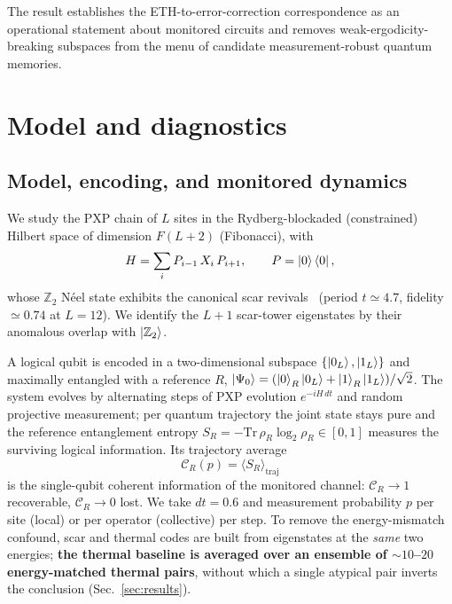 \documentclass[aps,prxquantum,twocolumn,superscriptaddress,floatfix,longbibliography]{revtex4-2}
\newcommand{\CR}{\mathcal{C}_R}
\newcommand{\Ztwo}{\mathbb{Z}_2}
\begin{document}
The result establishes the ETH-to-error-correction correspondence as an operational
statement about monitored circuits and removes weak-ergodicity-breaking subspaces
from the menu of candidate measurement-robust quantum memories.

\section{Model and diagnostics}

\subsection{Model, encoding, and monitored dynamics}

We study the PXP chain of $L$ sites in the Rydberg-blockaded (constrained)
Hilbert space of dimension $F(L{+}2)$ (Fibonacci), with
\begin{equation}
H = \sum_i P_{i-1}\, X_i\, P_{i+1}, \qquad P=\ket{0}\bra{0},
\end{equation}
whose $\Ztwo$ N\'eel state exhibits the canonical scar
revivals~\cite{Bernien2017,Turner2018,Lin2019,Ho2019} (period
$t\simeq4.7$, fidelity $\simeq0.74$ at $L=12$). We identify the $L{+}1$ scar-tower
eigenstates by their anomalous overlap with $\ket{\Ztwo}$.

A logical qubit is encoded in a two-dimensional subspace
$\{\ket{0_L},\ket{1_L}\}$ and maximally entangled with a reference $R$,
$\ket{\Psi_0}=(\ket{0}_R\ket{0_L}+\ket{1}_R\ket{1_L})/\sqrt2$. The system
evolves by alternating steps of PXP evolution $e^{-iH\,dt}$ and random projective
measurement; per quantum trajectory the joint state stays pure and the reference
entanglement entropy $S_R=-\mathrm{Tr}\,\rho_R\log_2\rho_R\in[0,1]$ measures the
surviving logical information. Its trajectory average
\begin{equation}
\CR(p) = \big\langle S_R \big\rangle_{\text{traj}}
\end{equation}
is the single-qubit coherent information of the monitored channel: $\CR\to1$
recoverable, $\CR\to0$ lost. We take $dt=0.6$ and measurement probability $p$
per site (local) or per operator (collective) per step. To remove the
energy-mismatch confound, scar and thermal codes are built from eigenstates at
the \emph{same} two energies; \textbf{the thermal baseline is averaged over an
ensemble of $\sim\!10$--$20$ energy-matched thermal pairs}, without which a single
atypical pair inverts the conclusion (Sec.~\ref{sec:results}).
\end{document}
